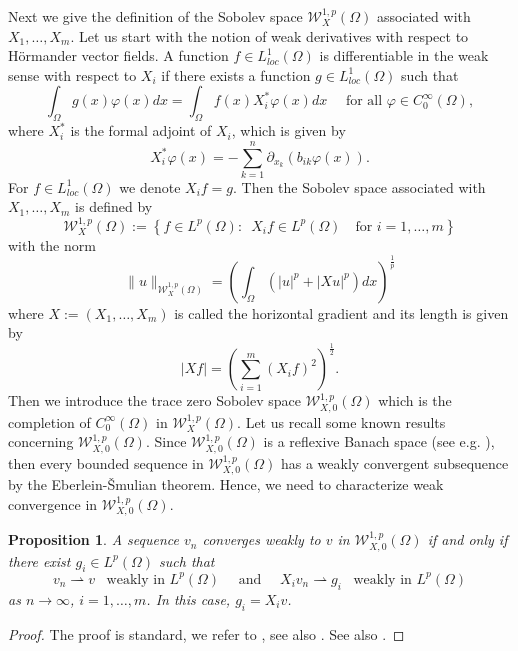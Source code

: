 \documentclass[a4paper,12pt,reqno]{amsart}
\numberwithin{equation}{section}
\theoremstyle{plain}
\newtheorem{proposition}[theorem]{Proposition}
\theoremstyle{definition}
\begin{document}
Next we  give the definition of the Sobolev space $\mathcal{W}_{X}^{1, p}(\Omega)$ associated with  $X_{1}, \ldots, X_{m}$. Let us start with the notion of weak derivatives with respect to H\"ormander vector fields. A function $f\in L^{1}_{loc}(\Omega)$ is differentiable in the weak sense with respect to $X_{i}$ if there exists a function $g\in L^{1}_{loc}(\Omega)$ such that
\begin{equation*}
\int_{\Omega} g(x)  \varphi(x) d x=\int_{\Omega} f(x) X_{i}^{*} \varphi(x) d x\quad \text{ for all } \varphi \in C_{0}^{\infty}(\Omega),
\end{equation*}
where $X_{i}^{*}$ is the formal adjoint of $X_{i}$, which is given by
$$
X_{i}^{*}\varphi(x)=-\sum_{k=1}^n \partial_{x_{k}}\left(b_{ik} \varphi(x)\right).
$$
For $f\in L^{1}_{loc}(\Omega)$ we denote $X_{i}f=g$. Then the Sobolev space associated with $X_{1}, \ldots, X_{m}$ is defined by
\begin{equation*}
\mathcal{W}_{X}^{1, p}(\Omega):=\left\{f \in L^{p}(\Omega):\enspace X_{i} f \in L^{p}(\Omega)\quad \text{for } i=1, \ldots, m \right\}
\end{equation*}
with the norm
\begin{equation}\label{natural norm}
\|u\|_{\mathcal{W}_{X}^{1, p}(\Omega)}=\left(\int_{\Omega}\left(|u|^p+|X u|^p\right) d x\right)^{\frac{1}{p}}
\end{equation}
where $X:=\left(X_{1}, \ldots, X_{m}\right)$ is called the horizontal gradient and its length is given by
$$|X f|=\left(\sum_{i=1}^{m}\left(X_{i} f\right)^{2}\right)^{\frac{1}{2}}.$$
Then we introduce the trace zero Sobolev space $\mathcal{W}_{X,0}^{1, p}(\Omega)$ which is the completion of $C_{0}^{\infty}(\Omega)$ in $\mathcal{W}_{X}^{1, p}(\Omega)$. 
Let us recall some known results concerning $\mathcal{W}_{X,0}^{1, p}(\Omega)$. Since $\mathcal{W}_{X,0}^{1, p}(\Omega)$ is a  reflexive Banach space (see e.g. \cite[Theorem 1]{xu1990subelliptic}), then every bounded sequence in $\mathcal{W}_{X,0}^{1, p}(\Omega)$ has a weakly convergent subsequence by the Eberlein-\v{S}mulian theorem. Hence, we need to characterize weak convergence in $\mathcal{W}_{X,0}^{1, p}(\Omega)$.
\begin{proposition}\label{Weak convergence characterization}
A sequence $v_n$ converges weakly to $v$ in $\mathcal{W}_{X,0}^{1, p}(\Omega)$ if and only if there exist $g_{i}\in L^{p}(\Omega)$ such that 
$$v_n\rightharpoonup v \enspace\text{ weakly in } L^{p}(\Omega) \quad \text{ and } \quad X_{i}v_n\rightharpoonup g_{i}\enspace \text{ weakly in } L^{p}(\Omega)$$ 
as $n\to\infty$, $i=1,\ldots,m$. In this case, $g_{i}=X_{i}v$.
\end{proposition}
\begin{proof}
The proof is standard, we refer to \cite[Proposition 1.8]{LeDret2018}, see also \cite[Corollary 11.70]{Leoni2017Sobolev}. See also \cite[Proposition 2.2]{capogna2024asymptotic}.
\end{proof}
\end{document}
